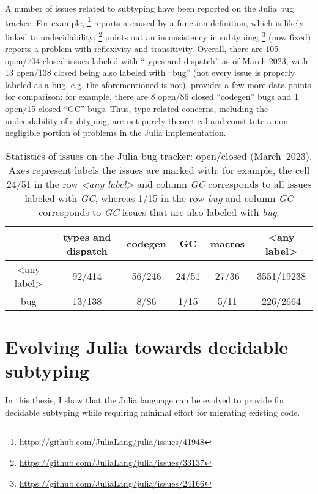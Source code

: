 A number of issues related to subtyping have been reported
on the Julia bug tracker. For example,
\href{https://github.com/JuliaLang/julia/issues/41948}{}\footnote{
    \url{https://github.com/JuliaLang/julia/issues/41948}
} reports a  caused by a function definition,
which is likely linked to undecidability;
\href{https://github.com/JuliaLang/julia/issues/33137}{}\footnote{
    \url{https://github.com/JuliaLang/julia/issues/33137}
} points out an inconsistency in subtyping; %
\href{https://github.com/JuliaLang/julia/issues/24166}{}\footnote{
    \url{https://github.com/JuliaLang/julia/issues/24166} 
} (now fixed) reports a problem with reflexivity and transitivity.
Overall, there are 105 open/704 closed issues labeled with ``types and
dispatch'' as of March 2023,
with 13 open/138 closed being also labeled with ``bug''
(not every issue is properly labeled as a bug,
e.g. the aforementioned
\href{https://github.com/JuliaLang/julia/issues/24166}{} is not).
 provides a few more data points for comparison:
for example, there are 8 open/86 closed ``codegen'' bugs
and 1 open/15 closed ``GC'' bugs.
Thus, type-related concerns, including the undecidability of subtyping,
are not purely theoretical and
constitute a non-negligible portion of problems in the Julia implementation.

\begin{table}[t]
\caption{Statistics of issues on the Julia bug tracker: open/closed (March~2023).
Axes represent labels the issues are marked with: for example, the cell
24/51 in the row \emph{<any label>} and column \emph{GC} corresponds to all
issues labeled with \emph{GC}, whereas 1/15 in the row \emph{bug} and column 
\emph{GC} corresponds to \emph{GC} issues that are also labeled with \emph{bug}.
}\label{tab:julia-issues-stats}
\vspace*{0.25em}
\centering\footnotesize
\begin{tabular}{c|ccccc}
 & types and dispatch & codegen & GC & macros & <any label> \\
\midrule
<any label> &
  92/414 & 56/246 & 24/51 & 27/36 & 3551/19238 \\
bug &
  13/138 & 8/86 & 1/15 & 5/11 & 226/2664
\end{tabular}
\end{table}


\section{Evolving Julia towards decidable subtyping}

In this thesis, I show that
the Julia language can be evolved to provide for decidable subtyping while
requiring minimal effort for migrating existing code.

